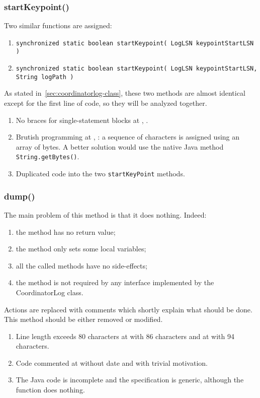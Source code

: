 \subsubsection{startKeypoint()}
Two similar functions are assigned:
\begin{enumerate}
    \item \texttt{\footnotesize synchronized static boolean startKeypoint( LogLSN keypointStartLSN )}
    \item \texttt{\footnotesize synchronized static boolean startKeypoint( LogLSN keypointStartLSN, String logPath )}
\end{enumerate}

As stated in~\autoref{sec:coordinatorlog-class}, these two methods are almost identical except for the first line of code, so they will be analyzed together.

\begin{enumerate}
    \item {} No braces for single-statement blocks at , .
    \item {} Brutish programming at , : a sequence of characters is assigned using an array of bytes. A better solution would use the native Java method \texttt{String.getBytes()}.
    \item {} Duplicated code into the two \texttt{startKeyPoint} methods.
\end{enumerate}


\subsubsection{dump()}
The main problem of this method is that it does nothing.
Indeed:
\begin{enumerate}
    \item the method has no return value;
    \item the method only sets some local variables;
    \item all the called methods have no side-effects;
    \item the method is not required by any interface implemented by the CoordinatorLog class.
\end{enumerate}
Actions are replaced with comments which shortly explain what should be done.
This method should be either removed or modified.
\begin{enumerate}
	\item {} Line length exceeds 80 characters at  with 86 characters and at  with 94 characters.
	\item {} Code commented at  without date and with trivial motivation.
	\item {} The Java code is incomplete and the specification is generic, although the function does nothing.
\end{enumerate}

